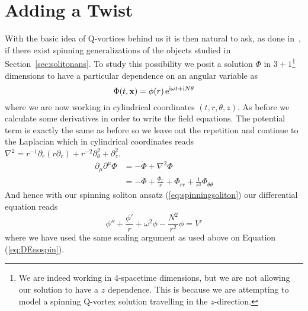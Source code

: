 \section{Adding a Twist}
With the basic idea of Q-vortices behind us it is then natural to ask, as done
in~\cite{spinningq}, if there exist spinning generalizations of the objects
studied in Section~\ref{sec:solitonans}. To study this possibility we posit a
solution \(\Phi\) in \(3 + 1\)\footnote{We are indeed working in 4-spacetime
dimensions, but we are not allowing our solution to have a \(z\) dependence.
This is because we are attempting to model a spinning Q-vortex solution
travelling in the \(z\)-direction.} dimensions to have a particular dependence
on an angular variable as
\begin{equation}\label{eq:spinningsoliton}
    \Phi(t, \mathbf{x}) = \phi(r)\,\mathrm{e}^{\mathrm{i}\omega t + \mathrm{i} N\theta}
\end{equation}
where we are now working in cylindrical coordinates \((t, r, \theta, z)\). As
before we calculate some derivatives in order to write the field equations. The
potential term is exactly the same as before so we leave out the repetition and
continue to the Laplacian which in cylindrical coordinates reads
\(\nabla^2 = r^{-1}\partial_r\left(r\partial_r\right) + r^{-2}\partial_\theta^2 + \partial_z^2\).
\begin{align}
    \partial_\mu\partial^\mu\Phi & = -\ddot{\Phi} + \nabla^2\Phi \\
                                 & = -\ddot{\Phi} + \frac{\Phi_r}{r}  + \Phi_{rr} + \frac{1}{r^2}\Phi_{\theta\theta}
\end{align}
And hence with our spinning soliton ansatz (\ref{eq:spinningsoliton}) our
differential equation reads
\begin{equation}\label{eq:DE}
    \phi'' + \frac{\phi'}{r} + \omega^2\phi - \frac{N^2}{r^2}\phi = V'
\end{equation}
where we have used the same scaling argument as used above on Equation (\ref{eq:DEnospin}).

